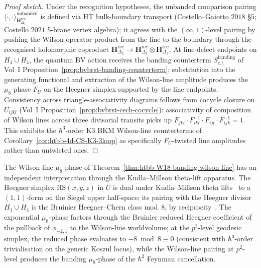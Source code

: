 \begin{proof}[Proof sketch]
Under the recognition hypotheses, the unbanded comparison pairing
$\langle\cdot,\cdot\rangle^{\mathrm{unbanded}}_{\mathbf{H}_{\Delta_5}^{\mathrm{rec}}}$
is defined via HT bulk-boundary transport
\textup{(}Costello--Gaiotto $2018$ \S$5$; Costello $2021$ 5-brane
vertex algebra\textup{);} it agrees with the $(\infty,1)$-level
pairing by pushing the Wilson operator product from the line to the
boundary through the recognised holomorphic coproduct
$\mathbf{H}_{\Delta_5}^{\mathrm{rec}}\to
\mathbf{H}_{\Delta_5}^{\mathrm{rec}}\otimes
\mathbf{H}_{\Delta_5}^{\mathrm{rec}}$.
At line-defect endpoints on $H_1 \cup H_4$, the quantum BV action
receives the banding counterterm
$S^{\mathrm{banding}}_{\mathrm{c.t.}}$ of Vol~I
Proposition~\ref{prop:bvbrst-banding-counterterm};
substitution into the generating functional and extraction of the
Wilson-line amplitude produces the $\mu_8$-phase $F_U$ on the
Heegner simplex supported by the line endpoints. Consistency across
triangle-associativity diagrams follows from cocycle closure on
$U_{ijkl}$ \textup{(}Vol~I
Proposition~\ref{prop:bvbrst-cech-cocycle}\textup{):}
associativity of composition of Wilson lines across three divisorial
transits picks up
$F_{jkl}\cdot F_{ikl}^{-1}\cdot F_{ijl}\cdot F_{ijk}^{-1} = 1$. This
exhibits the $\hbar^3$-order K3 BKM Wilson-line counterterms of
Corollary~\ref{cor:htbb-4d-CS-K3-3loop} as specifically $F_U$-twisted
line amplitudes rather than untwisted ones.
\end{proof}

\begin{remark}
\label{rem:htbb-mu8-kudla-millson}
The Wilson-line $\mu_8$-phase of
Theorem~\ref{thm:htbb-W18-banding-wilson-line} has an independent
interpretation through the Kudla--Millson theta-lift apparatus. The
Heegner simplex $\mathrm{HS}(x, y, z)$ in $U$ is dual under
Kudla--Millson theta lifts~\cite{KudlaMillson1990} to a $(1,1)$-form
on the Siegel upper half-space; its pairing with the Heegner divisor
$H_1\cup H_4$ is the Bruinier Heegner--Chern class mod~$8$, by
reciprocity~\cite[Proposition 5.1]{Bruinier2002}. The exponential
$\mu_8$-phase factors through the Bruinier reduced Heegner coefficient
of the pullback of $\phi_{-2,1}$ to the Wilson-line worldvolume; at the
$p^3$-level geodesic simplex, the reduced phase evaluates to
$-8 \bmod 8 \equiv 0$ (consistent with $\hbar^3$-order
trivialisation on the generic Koszul locus), while the Wilson-line
pairing at $p^2$-level produces the banding $\mu_8$-phase of the
$\hbar^2$ Feynman cancellation.
\end{remark}

